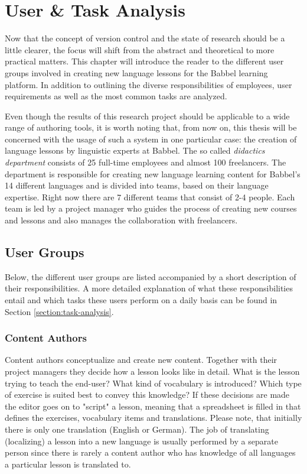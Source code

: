 \chapter{User \& Task Analysis} \label{chapter:user-research}
Now that the concept of version control and the state of research should be a little clearer, the focus will shift from the abstract and theoretical to more practical matters. This chapter will introduce the reader to the different user groups involved in creating new language lessons for the Babbel learning platform. In addition to outlining the diverse responsibilities of  employees, user requirements as well as the most common tasks are analyzed.

Even though the results of this research project should be applicable to a wide range of authoring tools, it is worth noting that, from now on, this thesis will be concerned with the usage of such a system in one particular case: the creation of language lessons by linguistic experts at Babbel. The so called \textit{didactics department} consists of 25 full-time employees and almost 100 freelancers. The department is responsible for creating new language learning content for Babbel's 14 different languages and is divided into teams, based on their language expertise. Right now there are 7 different teams that consist of 2-4 people. Each team is led by a project manager who guides the process of creating new courses and lessons and also manages the collaboration with freelancers.

\section{User Groups}
Below, the different user groups are listed accompanied by a short description of their responsibilities. A more detailed explanation of what these responsibilities entail and which tasks these users perform on a daily basis can be found in Section \ref{section:task-analysis}.

\subsection{Content Authors}
Content authors conceptualize and create new content. Together with their project managers they decide how a lesson looks like in detail. What is the lesson trying to teach the end-user? What kind of vocabulary is introduced? Which type of exercise is suited best to convey this knowledge? If these decisions are made the editor goes on to "script" a lesson, meaning that a spreadsheet is filled in that defines the exercises, vocabulary items and translations. Please note, that initially there is only one translation (English or German). The job of translating (localizing) a lesson into a new language is usually performed by a separate person since there is rarely a content author who has knowledge of all languages a particular lesson is translated to.

